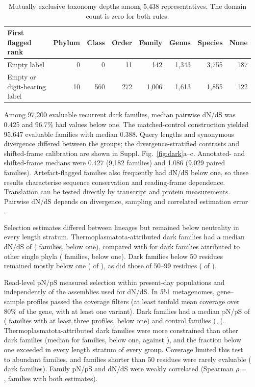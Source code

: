 \begin{table}[ht]\centering\small
\caption{Mutually exclusive taxonomy depths among 5,438 representatives. The domain count is zero for both rules.}\label{tab:naming}
\begin{tabular}{lrrrrrrr}\toprule
First flagged rank & Phylum & Class & Order & Family & Genus & Species & None\\\midrule
Empty label & 0 & 0 & 11 & 142 & 1,343 & 3,755 & 187\\
Empty or digit-bearing label & 10 & 560 & 272 & 1,006 & 1,613 & 1,855 & 122\\\bottomrule
\end{tabular}\end{table}

Among 97,200 evaluable recurrent dark families, median pairwise dN/dS was 0.425 and 96.7\% had values below one. The matched-control construction yielded 95,647 evaluable families with median 0.388. Query lengths and synonymous divergence differed between the groups; the divergence-stratified contrasts and shifted-frame calibration are shown in Suppl. Fig.~\ref{fig:dark}a--c. Annotated- and shifted-frame medians were 0.427 (9,182 families) and 1.086 (9,029 paired families). Artefact-flagged families also frequently had dN/dS below one, so these results characterise sequence conservation and reading-frame dependence. Translation can be tested directly by transcript and protein measurements. Pairwise dN/dS depends on divergence, sampling and correlated estimation error \citep{kryazhimskiy2008dnds,mugal2014time}.

Selection estimates differed between lineages but remained below neutrality in every length stratum. Thermoplasmatota-attributed dark families had a median dN/dS of  ( families,  below one), compared with  for dark families attributed to other single phyla ( families,  below one). Dark families below 50 residues remained mostly below one ( of ), as did those of 50--99 residues ( of ).

Read-level pN/pS measured selection within present-day populations and independently of the assemblies used for dN/dS. In 551 metagenomes,  gene--sample profiles passed the coverage filters (at least tenfold mean coverage over 80\% of the gene, with at least one variant). Dark families had a median pN/pS of  ( families with at least three profiles,  below one) and control families  (, ). Thermoplasmatota-attributed dark families were more constrained than other dark families (median  for  families,  below one, against ), and the fraction below one exceeded  in every length stratum of every group. Coverage limited this test to abundant families, and families shorter than 50 residues were rarely evaluable ( dark families). Family pN/pS and dN/dS were weakly correlated (Spearman $\rho=$ ,  families with both estimates).

